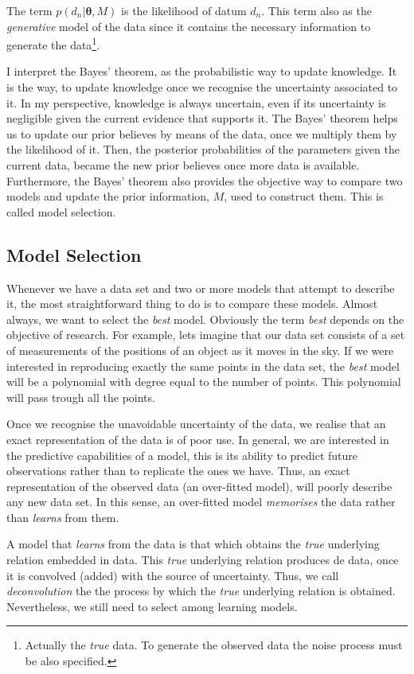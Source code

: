 The term $p(d_n|\mathbf{\theta},M)$ is the likelihood of datum $d_n$. This term also as the \emph{generative} model of the data since it contains the necessary information to generate the data\footnote{Actually the \emph{true} data. To generate the observed data the noise process must be also specified.}.

I interpret the Bayes' theorem, as the probabilistic way to update knowledge. It is the way, to update knowledge once we recognise the uncertainty associated to it. In my perspective, knowledge is always uncertain, even if its uncertainty is negligible given the current evidence that supports it. The Bayes' theorem helps us to update our prior believes by means of the data, once we multiply them by the likelihood of it. Then, the posterior probabilities of the parameters given the current data, became the new prior believes once more data is available. Furthermore, the Bayes' theorem also provides the objective way to compare two models and update the prior information, $M$, used to construct them. This is called model selection.

\subsection{Model Selection}

Whenever we have a data set and two or more models that attempt to describe it, the most straightforward thing to do is to compare these models. Almost always, we want to select the \emph{best} model. Obviously the term \emph{best} depends on the objective of research. For example, lets imagine that our data set consists of a set of measurements of the positions of an object as it moves in the sky. If we were interested in reproducing exactly the same points in the data set, the \emph{best} model will be a polynomial with degree equal to the number of points. This polynomial will pass trough all the points. 

Once we recognise the unavoidable uncertainty of the data, we realise that an exact representation of the data is of poor use. 
In general, we are interested in the predictive capabilities of a model, this is its ability to predict future observations rather than to replicate the ones we have. Thus, an exact representation of the observed data (an over-fitted model), will poorly describe any new data set. In this sense, an over-fitted model \emph{memorises} the data rather than \emph{learns} from them.

A model that \emph{learns} from the data is that which obtains the \emph{true} underlying relation embedded in data.  This \emph{true} underlying relation produces de data, once it is convolved (added) with the source of uncertainty. Thus, we call \emph{deconvolution} the the process by which the \emph{true} underlying relation is obtained. Nevertheless, we still need to select among learning models.  

